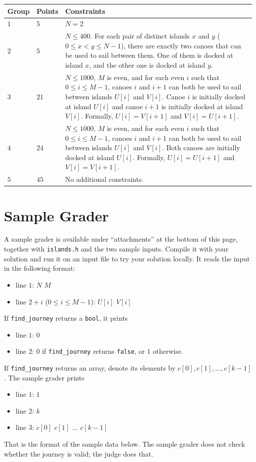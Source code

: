\noindent
\begin{tabular}{| l | l | p{12cm} |}
  \hline
  \textbf{Group} & \textbf{Points} & \textbf{Constraints} \\ \hline
  $1$ & $5$  & $N = 2$ \\ \hline
  $2$ & $5$  & $N \leq 400$. For each pair of distinct islands $x$ and $y$
               ($0 \leq x < y \leq N-1$), there are exactly two canoes that can be used to sail
               between them. One of them is docked at island $x$, and the other one is docked at
               island $y$. \\ \hline
  $3$ & $21$ & $N \leq 1000$, $M$ is even, and for each even $i$ such that $0 \leq i \leq M-1$,
               canoes $i$ and $i+1$ can both be used to sail between islands $U[i]$ and $V[i]$.
               Canoe $i$ is initially docked at island $U[i]$ and canoe $i+1$ is initially docked at
               island $V[i]$. Formally, $U[i] = V[i+1]$ and $V[i] = U[i+1]$. \\ \hline
  $4$ & $24$ & $N \leq 1000$, $M$ is even, and for each even $i$ such that $0 \leq i \leq M-1$,
               canoes $i$ and $i+1$ can both be used to sail between islands $U[i]$ and $V[i]$.
               Both canoes are initially docked at island $U[i]$. Formally, $U[i] = U[i+1]$ and
               $V[i] = V[i+1]$. \\ \hline
  $5$ & $45$ & No additional constraints. \\ \hline
\end{tabular}

\section*{Sample Grader}
A sample grader is available under ``attachments'' at the bottom of this page, together with
\texttt{islands.h} and the two sample inputs. Compile it with your solution and run it on an input
file to try your solution locally. It reads the input in the following format:
\begin{itemize}
  \item line $1$: $N$ $M$
  \item line $2 + i$ ($0 \leq i \leq M-1$): $U[i]$ $V[i]$
\end{itemize}
If \texttt{find\_journey} returns a \texttt{bool}, it prints
\begin{itemize}
  \item line $1$: $0$
  \item line $2$: $0$ if \texttt{find\_journey} returns \texttt{false}, or $1$ otherwise.
\end{itemize}
If \texttt{find\_journey} returns an array, denote its elements by
$c[0], c[1], \ldots, c[k-1]$. The sample grader prints
\begin{itemize}
  \item line $1$: $1$
  \item line $2$: $k$
  \item line $3$: $c[0]$ $c[1]$ $\ldots$ $c[k-1]$
\end{itemize}
That is the format of the sample data below. The sample grader does not check whether the journey is
valid; the judge does that.


